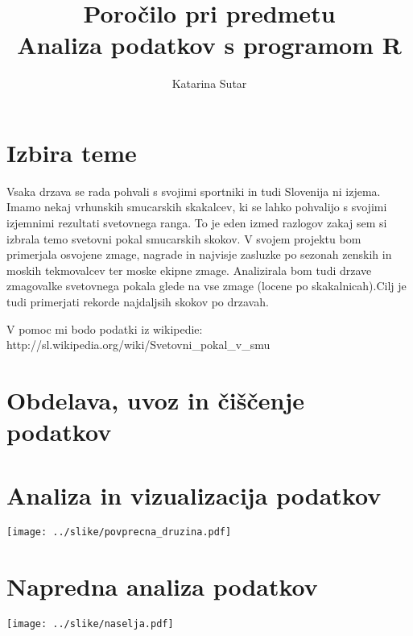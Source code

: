 \documentclass[11pt,a4paper]{article}
\begin{document}
\title{Poročilo pri predmetu \\
Analiza podatkov s programom R}
\author{Katarina Sutar}
\maketitle

\section{Izbira teme}

Vsaka drzava se rada pohvali s svojimi sportniki in tudi Slovenija ni izjema. Imamo nekaj vrhunskih smucarskih skakalcev, ki se lahko pohvalijo s svojimi izjemnimi rezultati svetovnega ranga. To je eden izmed razlogov zakaj sem si izbrala temo svetovni pokal smucarskih skokov. V svojem projektu bom primerjala osvojene zmage, nagrade in najvisje zasluzke po sezonah zenskih in moskih tekmovalcev ter moske ekipne zmage. Analizirala bom tudi drzave zmagovalke svetovnega pokala glede na vse zmage (locene po skakalnicah).Cilj je tudi primerjati rekorde najdaljsih skokov po drzavah.

V pomoc mi bodo podatki iz wikipedie: http://sl.wikipedia.org/wiki/Svetovni_pokal_v_smu%


\section{Obdelava, uvoz in čiščenje podatkov}

\section{Analiza in vizualizacija podatkov}

\texttt{[image: ../slike/povprecna\_druzina.pdf]}

\section{Napredna analiza podatkov}

\texttt{[image: ../slike/naselja.pdf]}
\end{document}
